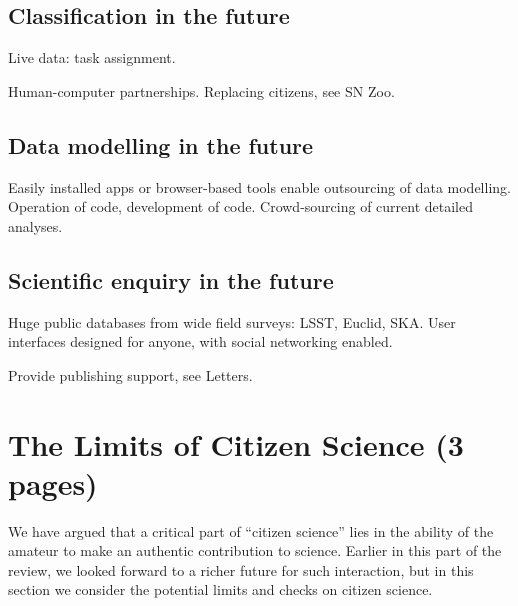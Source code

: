 \documentclass{ar2e}
\begin{document}

\subsection{Classification in the future}
\label{sec:future:class}

Live data: task assignment. 

Human-computer partnerships. Replacing citizens, see SN Zoo.



\subsection{Data modelling in the future}
\label{sec:future:models}

Easily installed apps or browser-based tools enable outsourcing of data
modelling. Operation of code, development of code. Crowd-sourcing of current
detailed analyses.



\subsection{Scientific enquiry in the future}
\label{sec:future:enquiry}

Huge public databases from wide field surveys: LSST, Euclid, SKA. User
interfaces designed for anyone, with social networking enabled. 

Provide publishing support, see Letters.



\section{The Limits of Citizen Science (3 pages)}
\label{sec:limits}


We have argued that a critical part of ``citizen science'' lies in the ability of
the amateur to make an authentic contribution to science. Earlier in this part
of the review, we looked forward to a richer future for such interaction, but in
this section we consider the potential limits and checks on citizen science. 
\end{document}
